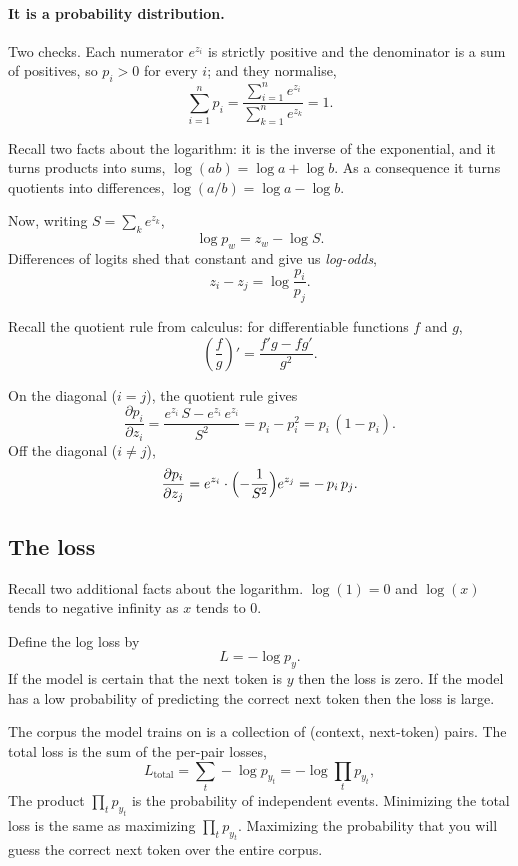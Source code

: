 \documentclass[11pt]{article}
\begin{document}
\paragraph{It is a probability distribution.} Two checks. Each numerator $e^{z_i}$ is
strictly positive and the denominator is a sum of positives, so $p_i > 0$ for every $i$;
and they normalise,
\[
  \sum_{i=1}^{n} p_i = \frac{\sum_{i=1}^n e^{z_i}}{\sum_{k=1}^n e^{z_k}} = 1 .
\]

Recall two facts about the logarithm: it is the inverse of the exponential, and it turns
products into sums, $\log(ab) = \log a + \log b$. As a consequence it turns quotients into
differences, $\log(a/b) = \log a - \log b$.

Now, writing $S = \sum_k e^{z_k}$,
\[
  \log p_w = z_w - \log S .
\]
Differences of logits shed that constant and give us \emph{log-odds},
\[
  z_i - z_j = \log\frac{p_i}{p_j} .
\]

Recall the quotient rule from calculus: for differentiable functions $f$ and $g$,
\[
  \left(\frac{f}{g}\right)' = \frac{f'g - f g'}{g^2}.
\]

On the diagonal ($i = j$), the quotient rule gives
\[
  \frac{\partial p_i}{\partial z_i}
    = \frac{e^{z_i}\,S - e^{z_i}\,e^{z_i}}{S^2}
    = p_i - p_i^2 = p_i\,(1 - p_i).
\]
Off the diagonal ($i \neq j$),
\[
  \frac{\partial p_i}{\partial z_j}
    = e^{z_i}\cdot\Bigl(-\frac{1}{S^2}\Bigr)e^{z_j}
    = -\,p_i\,p_j .
\]

\subsection*{The loss}

Recall two additional facts about the logarithm. $\log(1) = 0$ and $\log(x)$ tends to
negative infinity as $x$ tends to $0$.

Define the log loss by
\[
  L = -\log p_y .
\]
If the model is certain that the next token is $y$ then the loss is zero. If the model has
a low probability of predicting the correct next token then the loss is large.

The corpus the model trains on is a collection of (context, next-token) pairs. The total loss is the sum of the per-pair
losses,
\[
  L_{\text{total}} = \sum_t -\log p_{y_t} = -\log \prod_t p_{y_t},
\]
The product $\prod_t p_{y_t}$ is the probability of independent events. Minimizing the total
loss is the same as maximizing $\prod_t p_{y_t}$. Maximizing the probability that you will
guess the correct next token over the entire corpus.
\end{document}
